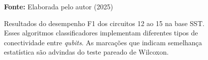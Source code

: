 \begin{figure}
\caption{Resultados do desempenho F1 dos circuitos 12 ao 15 na base \gls{SST}. Esses algoritmos classificadores implementam diferentes tipos de conectividade entre \textit{qubits}. As marcações que indicam semelhança estatística são advindas do teste pareado de Wilcoxon.}
\label{fig:f1:sst:g3}
     \centering
    \centering

      \par\medskip\ABNTEXfontereduzida\selectfont\textbf{Fonte:} Elaborada pelo autor (2025) \par\medskip
\end{figure}